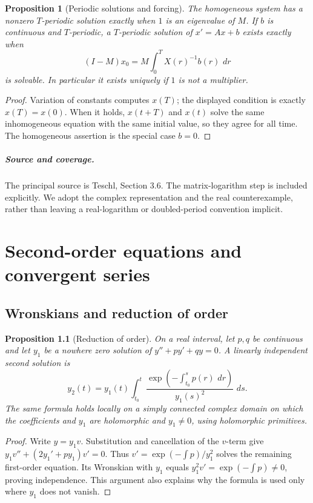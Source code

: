 \documentclass[11pt,oneside]{book}
\newtheorem{proposition}[theorem]{Proposition}
\theoremstyle{definition}
\theoremstyle{remark}\newtheorem{remark}[theorem]{Remark}
\newcommand{\dd}{\,d}\newcommand{\id}{\operatorname{id}}
\begin{document}
\begin{proposition}[Periodic solutions and forcing]\label{d13:08:periodic-forcing}
The homogeneous system has a nonzero \(T\)-periodic solution exactly when
\(1\) is an eigenvalue of \(M\). If \(b\) is continuous and \(T\)-periodic,
a \(T\)-periodic solution of \(x'=Ax+b\) exists exactly when
\[
 (I-M)x_0=M\int_0^T X(r)^{-1}b(r)\,\dd r
\]
is solvable. In particular it exists uniquely if \(1\) is not a multiplier.
\end{proposition}
\begin{proof}
Variation of constants computes \(x(T)\); the displayed condition is
exactly \(x(T)=x(0)\). When it holds, \(x(t+T)\) and \(x(t)\) solve the same
inhomogeneous equation with the same initial value, so they agree for all
time. The homogeneous assertion is the special case \(b=0\).
\end{proof}

\paragraph{Source and coverage.}
The principal source is Teschl, Section 3.6. The matrix-logarithm step is
included explicitly. We adopt the complex representation and the real
counterexample, rather than leaving a real-logarithm or doubled-period
convention implicit.



\chapter{Second-order equations and convergent series}\label{ch:d13-09}

\section{Wronskians and reduction of order}

\begin{proposition}[Reduction of order]\label{d13:09:reduction}
On a real interval, let \(p,q\) be continuous and let \(y_1\) be a nowhere
zero solution of \(y''+py'+qy=0\). A linearly independent second solution is
\[
 y_2(t)=y_1(t)\int_{t_0}^t
          \frac{\exp(-\int_{t_0}^s p(r)\,\dd r)}{y_1(s)^2}\,\dd s .
\]
The same formula holds locally on a simply connected complex domain on
which the coefficients and \(y_1\) are holomorphic and \(y_1\ne0\),
using holomorphic primitives.
\end{proposition}
\begin{proof}
Write \(y=y_1v\). Substitution and cancellation of the \(v\)-term give
\(y_1v''+(2y_1'+py_1)v'=0\). Thus
\(v'=\exp(-\int p)/y_1^2\) solves the remaining first-order equation.
Its Wronskian with \(y_1\) equals
\(y_1^2v'=\exp(-\int p)\ne0\), proving independence.
This argument also explains why the formula is used only where \(y_1\)
does not vanish.
\end{proof}
\end{document}

